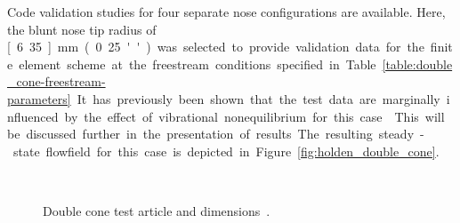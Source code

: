 Code validation studies for  four separate nose configurations are available. Here, the blunt nose tip radius of \unit[6.35]{mm} (0.25'') was selected to provide validation data for the finite element scheme at the freestream conditions specified in Table~\ref{table:double_cone-freestream-parameters}.  It has previously been shown that the test data are marginally influenced by the effect of vibrational nonequilibrium for this case~\cite{nompelis_candler_holden_double_cone,maclean_AIAA-2004-529}. This will be discussed further in the presentation of results. The resulting steady-state flowfield for this case is depicted in Figure~\ref{fig:holden_double_cone}.


\begin{figure}[hbtp]
  \begin{center}
     \\
    \caption[Double cone test article and dimensions.]{Double cone test article and dimensions~\cite{holden_wadhams_AIAA-2003-1137,maclean_AIAA-2004-529}.\label{fig:holden_double_cone_article}}
  \end{center}
\end{figure}

